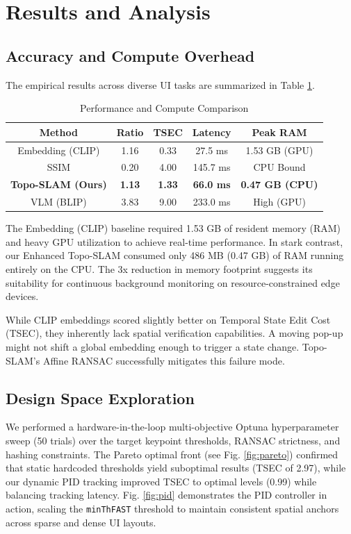 \documentclass[journal]{IEEEtran}
\begin{document}
\section{Results and Analysis}

\subsection{Accuracy and Compute Overhead}
The empirical results across diverse UI tasks are summarized in Table \ref{tab:results}.

\begin{table}[htbp]
\caption{Performance and Compute Comparison}
\label{tab:results}
\centering
\begin{tabular}{|c|c|c|c|c|}
\hline
\textbf{Method} & \textbf{Ratio} & \textbf{TSEC} & \textbf{Latency} & \textbf{Peak RAM} \\
\hline
Embedding (CLIP) & 1.16 & 0.33 & 27.5 ms & 1.53 GB (GPU) \\
SSIM & 0.20 & 4.00 & 145.7 ms & CPU Bound \\
\textbf{Topo-SLAM (Ours)} & \textbf{1.13} & \textbf{1.33} & \textbf{66.0 ms} & \textbf{0.47 GB (CPU)} \\
VLM (BLIP) & 3.83 & 9.00 & 233.0 ms & High (GPU) \\
\hline
\end{tabular}
\end{table}

The Embedding (CLIP) baseline required 1.53 GB of resident memory (RAM) and heavy GPU utilization to achieve real-time performance. In stark contrast, our Enhanced Topo-SLAM consumed only 486 MB (0.47 GB) of RAM running entirely on the CPU. The 3x reduction in memory footprint suggests its suitability for continuous background monitoring on resource-constrained edge devices.

While CLIP embeddings scored slightly better on Temporal State Edit Cost (TSEC), they inherently lack spatial verification capabilities. A moving pop-up might not shift a global embedding enough to trigger a state change. Topo-SLAM's Affine RANSAC successfully mitigates this failure mode.

\subsection{Design Space Exploration}
We performed a hardware-in-the-loop multi-objective Optuna hyperparameter sweep (50 trials) over the target keypoint thresholds, RANSAC strictness, and hashing constraints. The Pareto optimal front (see Fig. \ref{fig:pareto}) confirmed that static hardcoded thresholds yield suboptimal results (TSEC of 2.97), while our dynamic PID tracking improved TSEC to optimal levels (0.99) while balancing tracking latency. Fig. \ref{fig:pid} demonstrates the PID controller in action, scaling the \texttt{minThFAST} threshold to maintain consistent spatial anchors across sparse and dense UI layouts.
\end{document}
